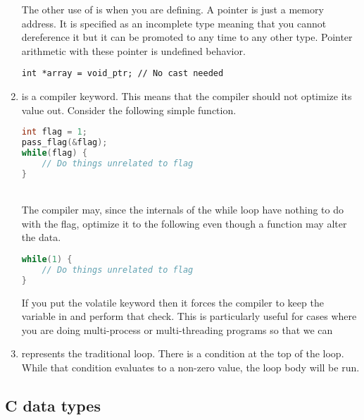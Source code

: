 \begin{enumerate}
The other use of  is when you are defining. A  pointer is just a memory address. It is specified as an incomplete type meaning that you cannot dereference it but it can be promoted to any time to any other type. Pointer arithmetic with these pointer is undefined behavior.

\begin{lstlisting}[langauge=C]
int *array = void_ptr; // No cast needed
\end{lstlisting}

\item {} is a compiler keyword. This means that the compiler should not optimize its value out. Consider the following simple function.
\\
\begin{lstlisting}[language=C]
int flag = 1;
pass_flag(&flag);
while(flag) {
    // Do things unrelated to flag
}
\end{lstlisting}
\\
The compiler may, since the internals of the while loop have nothing to do with the flag, optimize it to the following even though a function may alter the data.
\\
\begin{lstlisting}[language=C]
while(1) {
    // Do things unrelated to flag
}
\end{lstlisting}
If you put the volatile keyword then it forces the compiler to keep the variable in and perform that check. This is particularly useful for cases where you are doing multi-process or multi-threading programs so that we can
\item {} represents the traditional  loop. There is a condition at the top of the loop. While that condition evaluates to a non-zero value, the loop body will be run.
\end{enumerate}

\subsection{C data types}

